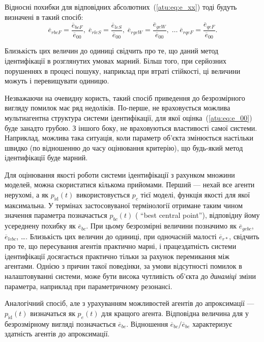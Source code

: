 Відносні похибки для відповідних абсолютних~(\ref{atu:eq:e_xx})
тоді будуть визначені в такий спосіб:
%
\begin{equation}
  \overline{e}_{rbcF} = \frac{\overline{e}_{bcF}}{\overline{e}_{00}}, \;
  \overline{e}_{rleS} = \frac{\overline{e}_{leS}}{\overline{e}_{00}}, \;
  \overline{e}_{rgeW} = \frac{\overline{e}_{geW}}{\overline{e}_{00}},
  \; \ldots \;
  \overline{e}_{rqeF} = \frac{\overline{e}_{qeF}}{\overline{e}_{00}}.
  \label{atu:eq:e_rxx}
\end{equation}

Близькість цих величин до одиниці свідчить про те, що даний метод ідентифікації
в розглянутих умовах марний. Більш того, при серйозних порушеннях в процесі
пошуку, наприклад при втраті стійкості, ці величини можуть і перевищувати
одиницю.

Незважаючи на очевидну користь, такий спосіб приведення до
безрозмірного вигляду помилок має ряд недоліків. По-перше,
не враховується можлива мультиагентна структура системи
ідентифікації, для якої оцінка~(\ref{atu:eq:e_00}) буде занадто
грубою. З іншого боку, не враховуються властивості самої
системи. Наприклад, можлива така ситуація, коли параметр об'єкта
змінюється настільки швидко (по відношенню до часу оцінювання
критерію), що будь-який метод ідентифікації буде марний.

Для оцінювання якості роботи системи ідентифікації з рахунком
множини моделей, можна скористатися кількома прийомами. Перший
--- нехай все агенти нерухомі, а як
$ p_\mathrm{id}(t) $ використовується
$ p_c $ тієї моделі, функція якості для якої максимальна. У термінах
застосовуваної термінології отримане таким чином значення
параметра позначається
$ p_{bc} (t) $ ( ``best central point''), відповідну йому усереднену похибку як
$ \overline{e}_{bc} $. При цьому безрозмірні величини позначимо як
$ \overline{e}_{gebc} $,
$ \overline{e}_{lebc} $, \ldots. Близькість цих величин до одиниці, при
одночасній малості
$ \overline{e}_{r *} $, свідчить про те, що пересування агентів практично
марні, і працездатність системи ідентифікації досягається
практично тільки за рахунок перемикання між агентами. Однією
з причин такої поведінки, за умови відсутності помилок в
налаштовуванні системи, може бути висока чутливість об'єкта до
\textit{динаміці} зміни параметра, наприклад при параметричному
резонансі.

Аналогічний спосіб, але з урахуванням можливостей агентів до
апроксимації ---
$ p_\mathrm{id} (t) $ визначаться як
$ p_e(t)$ для кращого агента. Відповідна величина для
у безрозмірному вигляді позначається
$ \overline{e}_{be} $. Відношення
$ \overline{e}_{bc} / \overline{e}_{be} $ характеризує здатність
агентів до апроксимації.


